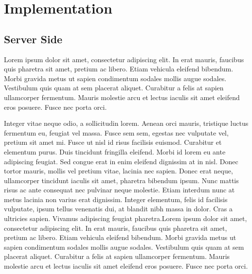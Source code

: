 \section{Implementation}
\label{sec:implementation}

\subsection{Server Side}
\label{subsec:Server Side}

Lorem ipsum dolor sit amet, consectetur adipiscing elit. In erat mauris, faucibus quis pharetra sit amet, pretium ac libero. Etiam vehicula eleifend bibendum. Morbi gravida metus ut sapien condimentum sodales mollis augue sodales. Vestibulum quis quam at sem placerat aliquet. Curabitur a felis at sapien ullamcorper fermentum. Mauris molestie arcu et lectus iaculis sit amet eleifend eros posuere. Fusce nec porta orci.

Integer vitae neque odio, a sollicitudin lorem. Aenean orci mauris, tristique luctus fermentum eu, feugiat vel massa. Fusce sem sem, egestas nec vulputate vel, pretium sit amet mi. Fusce ut nisl id risus facilisis euismod. Curabitur et elementum purus. Duis tincidunt fringilla eleifend. Morbi id lorem eu ante adipiscing feugiat. Sed congue erat in enim eleifend dignissim at in nisl. Donec tortor mauris, mollis vel pretium vitae, lacinia nec sapien. Donec erat neque, ullamcorper tincidunt iaculis sit amet, pharetra bibendum ipsum. Nunc mattis risus ac ante consequat nec pulvinar neque molestie. Etiam interdum nunc at metus lacinia non varius erat dignissim. Integer elementum, felis id facilisis vulputate, ipsum tellus venenatis dui, at blandit nibh massa in dolor. Cras a ultricies sapien. Vivamus adipiscing feugiat pharetra.Lorem ipsum dolor sit amet, consectetur adipiscing elit. In erat mauris, faucibus quis pharetra sit amet, pretium ac libero. Etiam vehicula eleifend bibendum. Morbi gravida metus ut sapien condimentum sodales mollis augue sodales. Vestibulum quis quam at sem placerat aliquet. Curabitur a felis at sapien ullamcorper fermentum. Mauris molestie arcu et lectus iaculis sit amet eleifend eros posuere. Fusce nec porta orci.

